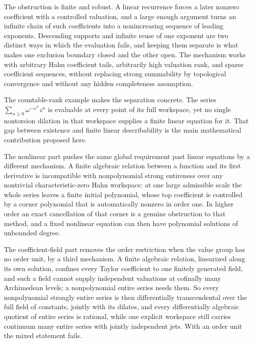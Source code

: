 \documentclass[11pt]{article}
\numberwithin{equation}{section}
\theoremstyle{definition}
\theoremstyle{remark}
\begin{document}
The obstruction is finite and robust. A linear recurrence forces a later
nonzero coefficient with a controlled valuation, and a large enough argument
turns an infinite chain of such coefficients into a nonincreasing sequence of
leading exponents. Descending supports and infinite reuse of one exponent are
two distinct ways in which the evaluation fails, and keeping them separate is
what makes one exclusion boundary closed and the other open. The mechanism
works with arbitrary Hahn coefficient tails, arbitrarily high valuation rank,
and sparse coefficient sequences, without replacing strong summability by
topological convergence and without any hidden completeness assumption.

The countable-rank example makes the separation concrete. The series
$\sum_{n\ge0}\omega^{-\omega^n}z^n$ is evaluable at every point of its full
workspace, yet no single nontorsion dilation in that workspace supplies a
finite linear equation for it. That gap between existence and finite linear
describability is the main mathematical contribution proposed here.

The nonlinear part pushes the same global requirement past linear
equations by a different mechanism. A finite algebraic relation between a
function and its first derivative is incompatible with nonpolynomial strong
entireness over any nontrivial characteristic-zero Hahn workspace: at one
large admissible scale the whole series leaves a finite initial polynomial,
whose top coefficient is controlled by a corner polynomial that is
automatically nonzero in order one. In higher order an exact cancellation of
that corner is a genuine obstruction to that method, and a fixed nonlinear
equation can then have polynomial solutions of unbounded degree.

The coefficient-field part removes the order restriction when the value
group has no order unit, by a third mechanism. A finite algebraic relation,
linearized along its own solution, confines every Taylor coefficient to one
finitely generated field, and such a field cannot supply independent
valuations at cofinally many Archimedean levels; a nonpolynomial entire
series needs them. So every nonpolynomial strongly entire series is then
differentially transcendental over the full field of constants, jointly with
its dilates, and every differentially algebraic quotient of entire series is
rational, while one explicit workspace still carries continuum many entire
series with jointly independent jets. With an order unit the mixed statement
fails.
\end{document}
